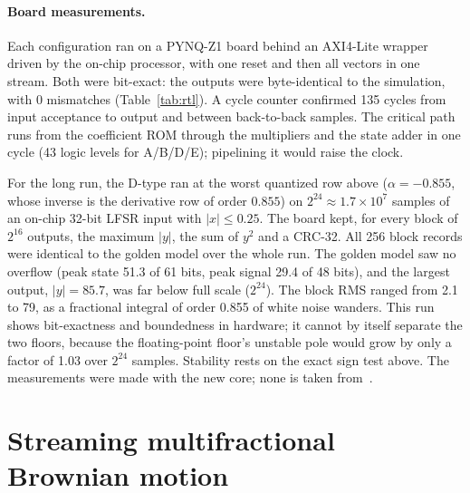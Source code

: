 \paragraph{Board measurements.} Each configuration ran on a PYNQ-Z1 board behind an AXI4-Lite wrapper driven by the on-chip processor, with one reset and then all vectors in one stream. Both were bit-exact: the outputs were byte-identical to the simulation, with 0 mismatches (Table~\ref{tab:rtl}). A cycle counter confirmed 135 cycles from input acceptance to output and between back-to-back samples. The critical path runs from the coefficient ROM through the multipliers and the state adder in one cycle (43 logic levels for A/B/D/E); pipelining it would raise the clock.

For the long run, the D-type ran at the worst quantized row above ($\alpha=-0.855$, whose inverse is the derivative row of order $0.855$) on $2^{24}\approx1.7\times10^7$ samples of an on-chip 32-bit LFSR input with $|x|\le0.25$. The board kept, for every block of $2^{16}$ outputs, the maximum $|y|$, the sum of $y^2$ and a CRC-32. All 256 block records were identical to the golden model over the whole run. The golden model saw no overflow (peak state 51.3 of 61 bits, peak signal 29.4 of 48 bits), and the largest output, $|y|=85.7$, was far below full scale ($2^{24}$). The block RMS ranged from 2.1 to 79, as a fractional integral of order 0.855 of white noise wanders. This run shows bit-exactness and boundedness in hardware; it cannot by itself separate the two floors, because the floating-point floor's unstable pole would grow by only a factor of 1.03 over $2^{24}$ samples. Stability rests on the exact sign test above. The measurements were made with the new core; none is taken from~\cite{tcas_submission}.


\section{Streaming multifractional Brownian motion}\label{sup:mbm}


